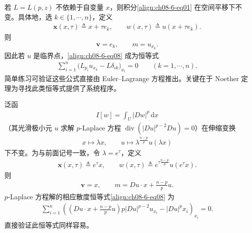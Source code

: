 \documentclass[../../main.tex]{subfiles}
\begin{document}
\begin{example}\label{example:ch08-6-1-平移不变}
若 $L=L(p,z)$ 不依赖于自变量 $x$，则积分\eqref{align:ch08-6-eq01} 在空间平移下不变。具体地，选 $k\in\{1,\cdots,n\}$，定义
\begin{align*}
\mathbf{x}(x,\tau)\triangleq x+\tau e_k,\qquad w(x,\tau)\triangleq u(x+\tau e_k).
\end{align*}
则
\begin{align*}
\mathbf{v}=e_k,\qquad m=u_{x_k}.
\end{align*}
因此若 $u$ 是临界点，\eqref{align:ch08-6-eq08} 成为恒等式
\begin{align}
\sum_{i=1}^n\big(L_{p_i}u_{x_k}-L\delta_{ik}\big)_{x_i}=0\qquad (k=1,\cdots,n).\label{align:ch08-6-eq09}
\end{align}
简单练习可验证这些公式直接由 Euler--Lagrange 方程推出。关键在于 Noether 定理为寻找此类恒等式提供了系统程序。
\end{example}

\begin{example}[伸缩不变性]\label{example:ch08-6-2-伸缩不变}
泛函
\begin{align*}
I[w]=\int_U|Dw|^p\,\mathrm{d}x
\end{align*}
（其光滑极小元 $u$ 求解 $p$-Laplace 方程 $\operatorname{div}(|Du|^{p-2}Du)=0$）在伸缩变换
\begin{align*}
x\mapsto\lambda x,\qquad u\mapsto\lambda^{\frac{n-p}{p}}u(\lambda x)
\end{align*}
下不变。为与前面记号一致，令 $\lambda=e^\tau$，定义
\begin{align*}
\mathbf{x}(x,\tau)\triangleq e^\tau x,\qquad w(x,\tau)\triangleq e^{\tau\frac{n-p}{p}}u(e^\tau x).
\end{align*}
则
\begin{align*}
\mathbf{v}=x,\qquad m=Du\cdot x+\frac{n-p}{p}u.
\end{align*}
$p$-Laplace 方程解的相应散度恒等式\eqref{align:ch08-6-eq08} 为
\begin{align}
\sum_{i=1}^n\left(\left(Du\cdot x+\frac{n-p}{p}u\right)p|Du|^{p-2}u_{x_i}-|Du|^p x_i\right)_{x_i}=0.\label{align:ch08-6-eq10}
\end{align}
直接验证此恒等式同样容易。
\end{example}
\end{document}
